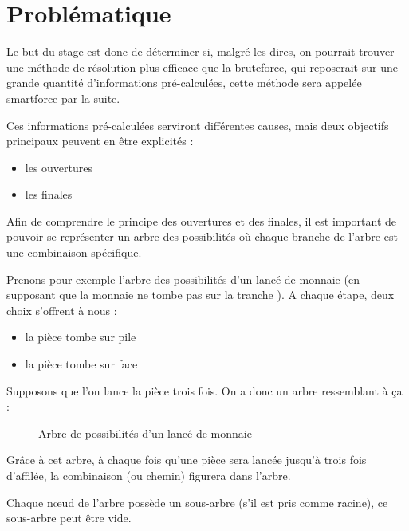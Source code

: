 \section{Problématique}

	Le but du stage est donc de déterminer si, malgré les dires, on pourrait trouver une méthode de résolution plus efficace que la bruteforce, qui reposerait sur une grande quantité d'informations pré-calculées, cette méthode sera appelée smartforce par la suite.

	Ces informations pré-calculées serviront différentes causes, mais deux objectifs principaux peuvent en être explicités :

	\begin{itemize}
		\item les ouvertures
		\item les finales
	\end{itemize}

	Afin de comprendre le principe des ouvertures et des finales, il est important de pouvoir se représenter un arbre des possibilités où chaque branche de l'arbre est une combinaison spécifique.

	\begin{exmp}
		Prenons pour exemple l'arbre des possibilités d'un lancé de monnaie (en supposant que la monnaie ne tombe pas sur la tranche \cite{murray1993probability}). A chaque étape, deux choix s'offrent à nous :
		\begin{itemize}
			\item la pièce tombe sur pile
			\item la pièce tombe sur face
		\end{itemize}

    Supposons que l'on lance la pièce trois fois. On a donc un arbre ressemblant à ça :

    \begin{figure}[H]
    	\begin{center}
    			
    	\end{center}
    \caption{Arbre de possibilités d'un lancé de monnaie}
    \label{fig:coin_tree}
    \end{figure}

    Grâce à cet arbre, à chaque fois qu'une pièce sera lancée jusqu'à trois fois d'affilée, la combinaison (ou chemin) figurera dans l'arbre.
    
    Chaque n\oe ud de l'arbre possède un sous-arbre (s'il est pris comme racine), ce sous-arbre peut être vide.
	\end{exmp}
	
